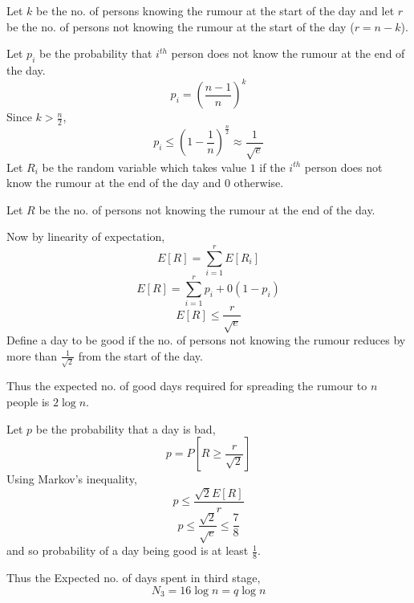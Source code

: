 \documentclass[a4paper]{article}
\begin{document}
Let $k$ be the no. of persons knowing the rumour at the start of the day and let $r$ be the no. of persons not knowing the rumour at the start of the day ($r = n-k$).

Let $p_i$ be the probability that $i^{th}$ person does not know the rumour at the end of the day.
$$p_i = \left(\frac{n-1}{n}\right)^k$$
Since $k > \frac{n}{2}$,
$$p_i \leq \left(1 - \frac{1}{n}\right)^{\frac{n}{2}} \approx \frac{1}{\sqrt{e}}$$
Let $R_i$ be the random variable which takes value $1$ if the $i^{th}$ person does not know the rumour at the end of the day and $0$ otherwise.

Let $R$ be the no. of persons not knowing the rumour at the end of the day.

Now by linearity of expectation,
$$E[R] = \sum_{i=1}^r E[R_i]$$
$$E[R] = \sum_{i=1}^r p_i + 0(1- p_i)$$
$$E[R] \leq \frac{r}{\sqrt{e}}$$
Define a day to be good if the no. of persons not knowing the rumour reduces by more than $\frac{1}{\sqrt{2}}$ from the start of the day.

Thus the expected no. of good days required for spreading the rumour to $n$ people is $2\log n$.

Let $p$ be the probability that a day is bad,
$$p = P\left[R \geq \frac{r}{\sqrt{2}}\right]$$
Using Markov's inequality,
$$p \leq \frac{\sqrt{2}E[R]}{r}$$
$$p \leq \frac{\sqrt{2}}{\sqrt{e}} \leq \frac{7}{8}$$
and so probability of a day being good is at least $\frac{1}{8}$.

Thus the Expected no. of days spent in third stage, $$N_3 = 16\log n = q \log n$$
\end{document}
